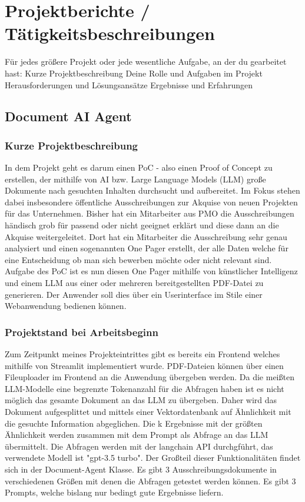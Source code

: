 \chapter{Projektberichte / Tätigkeitsbeschreibungen}
Für jedes größere Projekt oder jede wesentliche Aufgabe, an der du gearbeitet hast:
Kurze Projektbeschreibung
Deine Rolle und Aufgaben im Projekt
Herausforderungen und Lösungsansätze
Ergebnisse und Erfahrungen


\section{Document AI Agent}

\subsection{Kurze Projektbeschreibung}
In dem Projekt geht es darum einen PoC - also einen Proof of Concept zu erstellen, der mithilfe von AI bzw. Large Language Models (LLM) große Dokumente nach gesuchten Inhalten durchsucht und aufbereitet. Im Fokus stehen dabei insbesondere öffentliche Ausschreibungen zur Akquise von neuen Projekten für das Unternehmen. Bisher hat ein Mitarbeiter aus PMO die Ausschreibungen händisch grob für passend oder nicht geeignet erklärt und diese dann an die Akquise weitergeleitet. Dort hat ein Mitarbeiter die Ausschreibung sehr genau analysiert und einen sogenannten One Pager erstellt, der alle Daten welche für eine Entscheidung ob man sich bewerben möchte oder nicht relevant sind. Aufgabe des PoC ist es nun diesen One Pager mithilfe von künstlicher Intelligenz und einem LLM aus einer oder mehreren bereitgestellten PDF-Datei zu generieren. Der Anwender soll dies über ein Userinterface im Stile einer Webanwendung bedienen können.

\subsection{Projektstand bei Arbeitsbeginn}
Zum Zeitpunkt meines Projekteintrittes gibt es bereits ein Frontend welches mithilfe von Streamlit implementiert wurde. PDF-Dateien können über einen Fileuploader im Frontend an die Anwendung übergeben werden. Da die meißten LLM-Modelle eine begrenzte Tokenanzahl für die Abfragen haben ist es nicht möglich das gesamte Dokument an das LLM zu übergeben. Daher wird das Dokument aufgesplittet und mittels einer Vektordatenbank auf Ähnlichkeit mit die gesuchte Information abgeglichen. Die k Ergebnisse mit der größten Ähnlichkeit werden zusammen mit dem Prompt als Abfrage an das LLM übermittelt. Die Abfragen werden mit der langchain API durchgführt, das verwendete Modell ist "gpt-3.5 turbo". Der Großteil dieser Funktionalitäten findet sich in der Document-Agent Klasse. Es gibt 3 Ausschreibungsdokumente in verschiedenen Größen mit denen die Abfragen getestet werden können. Es gibt 3 Prompts, welche bislang nur bedingt gute Ergebnisse liefern.

